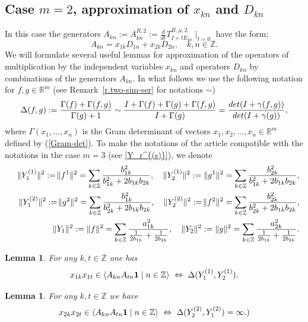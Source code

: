 \documentclass[preprint,12pt]{elsarticle}
\newcommand{\commA}[1]{\marginpar{%
\begin{color}{red}
\vskip-\baselineskip %
\raggedright\footnotesize
\itshape\hrule \smallskip A: #1\par\smallskip\hrule\end{color}}}
\newtheorem{lem}[thm]{Lemma}
\numberwithin{equation}{section}
\begin{document}
\subsection{Case $m=2$, approximation of $x_{kn}$ and $D_{kn}$}
In this case the generators
$A_{kn}:=A_{kn}^{R,2}:=\frac{d}{dt}T^{R,\mu,2}_{I+tE_{kn}}\mid_{t=0}$
have the form:
$$
A_{kn}=x_{1k}D_{1n}+x_{2k}D_{2n},\quad k,n \in {\mathbb Z}.
$$
We will formulate several  
useful lemmas for
approximation of the operators of multiplication by the independent variables $x_{kn}$ and operators
$D_{kn}$ by combinations of the generators $A_{kn}$. 
In what follows we use the following notation for $f,g\in{\mathbb R}^m$ (see Remark~\ref{r.two-sim-ser} for notations $\sim$)
%
{\small
\begin{equation}
\label{D(f,g)}
\Delta(f,g):=\frac{\Gamma(f)+\Gamma(f,g)}{\Gamma(g)+1}\sim
\frac{I+\Gamma(f)+\Gamma(g)+\Gamma(f,g)}{I+\Gamma(g)}=\frac{{\rm det}(I+\gamma(f,g))}{{\rm det}(I+\gamma(g))},
\end{equation}
}
%
where $\Gamma(x_1,\dots,x_n)$ is the Gram determinant 
of vectors $x_1,x_2,..., x_n\in {\mathbb R}^m$ defined  by (\ref{Gram-det}).
%
To make the notations of the article \cite{KosJFA17} compatible with the notations in the case $m=3$ (see \eqref{Y_r^{(s)}}), we denote
%
{\small
\begin{eqnarray}
\nonumber
&& \Vert Y_1^{(1)} \Vert^2:=\!\Vert f^1 \Vert^2=\sum_{k\in \mathbb Z}\frac{b_{1k}^2}{b_{1k}^2+2b_{1k}b_{2k}},\quad
\Vert Y_2^{(1)} \Vert^2:=\Vert g^1\Vert^2=\sum_{k\in \mathbb Z}\frac{b_{2k}^2}{b_{1k}^2+2b_{1k}b_{2k}},\\
\nonumber
&&\Vert Y_1^{(2)} \Vert^2:=\!\Vert g^2 \Vert^2=\sum_{k\in \mathbb Z}\frac{b_{1k}^2}{b_{2k}^2+2b_{1k}b_{2k}},\quad
\Vert Y_2^{(2)} \Vert^2:=\!\Vert f^2\Vert^2=\sum_{k\in \mathbb Z}\frac{b_{2k}^2}{b_{2k}^2+2b_{1k}b_{2k}},\\
\label{Y_r^{(s)}.m=2}
&&\Vert Y_1 \Vert^2:=\Vert f \Vert^2=\sum_{k\in \mathbb Z}\frac{a_{1k}^2}{\frac{1}{2b_{1k}}+\frac{1}{2b_{2k}}},\quad
\Vert Y_2 \Vert^2:=\Vert g\Vert^2=\sum_{k\in \mathbb Z}\frac{a_{2k}^2}{\frac{1}{2b_{1k}}+\frac{1}{2b_{2k}}}.
\end{eqnarray}
}
%
\begin{lem}
\label{x1x1}
  For any  $k,t\in {\mathbb Z}$ one has
$$
x_{1k}x_{1t}\in\langle A_{kn}A_{tn}{\bf 1}\mid n\in{\mathbb
Z}\rangle \,\,\Leftrightarrow\,\,\Delta(Y_1^{(1)},Y_2^{(1)}).
$$

\end{lem}
\begin{lem}
\label{x2x2} For any  $k,t\in {\mathbb Z}$ we have
$$
x_{2k}x_{2t}\in\langle A_{kn}A_{tn}{\bf 1}\mid n\in {\mathbb
Z}\rangle\,\,\Leftrightarrow\,\,\Delta(Y_2^{(2)},Y_1^{(2)})=\infty.)
$$
\end{lem}
\end{document}
